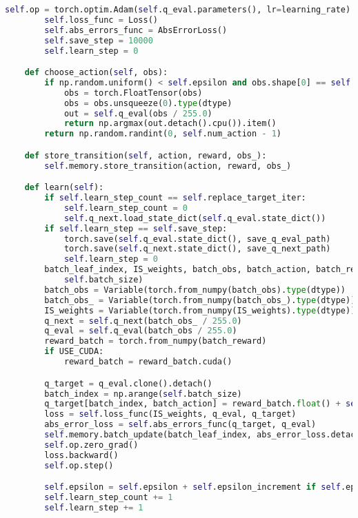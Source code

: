 \begin{lstlisting}[language={python}]
        self.op = torch.optim.Adam(self.q_eval.parameters(), lr=learning_rate)  # optimize all cnn parameters
        self.loss_func = Loss()
        self.abs_errors_func = AbsErrorLoss()
        self.save_step = 10000
        self.learn_step = 0

    def choose_action(self, obs):
        if np.random.uniform() < self.epsilon and obs.shape[0] == self.channels:
            obs = torch.FloatTensor(obs)
            obs = obs.unsqueeze(0).type(dtype)
            out = self.q_eval(obs / 255.0)
            return np.argmax(out.detach().cpu()).item()
        return np.random.randint(0, self.num_action - 1)

    def store_transition(self, action, reward, obs_):
        self.memory.store_transition(action, reward, obs_)

    def learn(self):
        if self.learn_step_count == self.replace_target_iter:
            self.learn_step_count = 0
            self.q_next.load_state_dict(self.q_eval.state_dict())
        if self.learn_step == self.save_step:
            torch.save(self.q_eval.state_dict(), save_q_eval_path)
            torch.save(self.q_next.state_dict(), save_q_next_path)
            self.learn_step = 0
        batch_leaf_index, IS_weights, batch_obs, batch_action, batch_reward, batch_obs_ = self.memory.get_memory(
            self.batch_size)
        batch_obs = Variable(torch.from_numpy(batch_obs).type(dtype))
        batch_obs_ = Variable(torch.from_numpy(batch_obs_).type(dtype))
        IS_weights = Variable(torch.from_numpy(IS_weights).type(dtype))
        q_next = self.q_next(batch_obs_ / 255.0)
        q_eval = self.q_eval(batch_obs / 255.0)
        reward_batch = torch.from_numpy(batch_reward)
        if USE_CUDA:
            reward_batch = reward_batch.cuda()

        q_target = q_eval.clone().detach()
        batch_index = np.arange(self.batch_size)
        q_target[batch_index, batch_action] = reward_batch.float() + self.gamma * torch.max(q_next, dim=1)[0]
        loss = self.loss_func(IS_weights, q_eval, q_target)
        abs_error_loss = self.abs_errors_func(q_target, q_eval)
        self.memory.batch_update(batch_leaf_index, abs_error_loss.detach().cpu())
        self.op.zero_grad()
        loss.backward()
        self.op.step()

        self.epsilon = self.epsilon + self.epsilon_increment if self.epsilon < self.epsilon_max else self.epsilon_max
        self.learn_step_count += 1
        self.learn_step += 1


\end{lstlisting}
